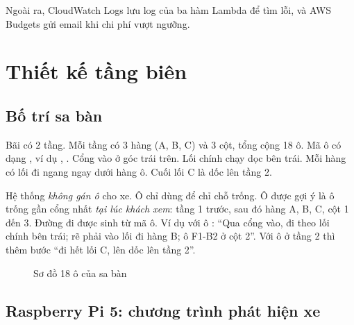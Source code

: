 Ngoài ra, CloudWatch Logs lưu log của ba hàm Lambda để tìm lỗi, và AWS Budgets gửi email khi chi phí vượt ngưỡng.

\section{Thiết kế tầng biên}

\subsection{Bố trí sa bàn}

Bãi có 2 tầng. Mỗi tầng có 3 hàng (A, B, C) và 3 cột, tổng cộng 18 ô. Mã ô có dạng , ví dụ , . Cổng vào ở góc trái trên. Lối chính chạy dọc bên trái. Mỗi hàng có lối đi ngang ngay dưới hàng ô. Cuối lối C là dốc lên tầng 2.

Hệ thống \emph{không gán ô} cho xe. Ô chỉ dùng để chỉ chỗ trống. Ô được gợi ý là ô trống gần cổng nhất \emph{tại lúc khách xem}: tầng 1 trước, sau đó hàng A, B, C, cột 1 đến 3. Đường đi được sinh từ mã ô. Ví dụ với ô : ``Qua cổng vào, đi theo lối chính bên trái; rẽ phải vào lối đi hàng B; ô F1-B2 ở cột 2''. Với ô ở tầng 2 thì thêm bước ``đi hết lối C, lên dốc lên tầng 2''.

\begin{figure}[H]
\centering
{}
\caption{Sơ đồ 18 ô của sa bàn}
\label{fig:sodo}
\end{figure}

\subsection{Raspberry Pi 5: chương trình phát hiện xe}

